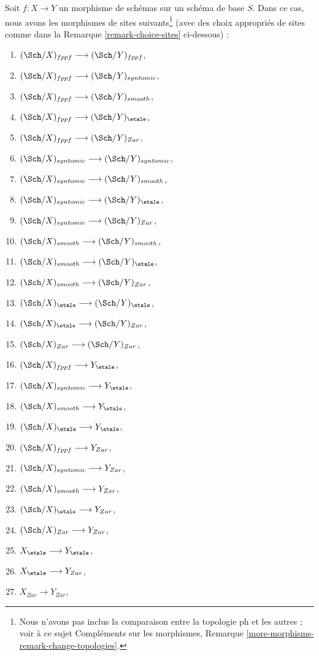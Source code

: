 \noindent
Soit $f : X \to Y$ un morphisme de schémas sur un schéma de base $S$. Dans ce cas, nous avons les morphismes de sites suivants\footnote{Nous n'avons pas inclus la comparaison entre la topologie ph et les autres ; voir à ce sujet Compléments sur les morphismes, Remarque \ref{more-morphisms-remark-change-topologies}.} (avec des choix appropriés de sites comme dans la Remarque \ref{remark-choice-sites} ci-dessous) :
\begin{enumerate}
\item $(\Sch/X)_{fppf} \longrightarrow (\Sch/Y)_{fppf}$,
\item $(\Sch/X)_{fppf} \longrightarrow (\Sch/Y)_{syntomic}$,
\item $(\Sch/X)_{fppf} \longrightarrow (\Sch/Y)_{smooth}$,
\item $(\Sch/X)_{fppf} \longrightarrow (\Sch/Y)_\etale$,
\item $(\Sch/X)_{fppf} \longrightarrow (\Sch/Y)_{Zar}$,
\item $(\Sch/X)_{syntomic} \longrightarrow (\Sch/Y)_{syntomic}$,
\item $(\Sch/X)_{syntomic} \longrightarrow (\Sch/Y)_{smooth}$,
\item $(\Sch/X)_{syntomic} \longrightarrow (\Sch/Y)_\etale$,
\item $(\Sch/X)_{syntomic} \longrightarrow (\Sch/Y)_{Zar}$,
\item $(\Sch/X)_{smooth} \longrightarrow (\Sch/Y)_{smooth}$,
\item $(\Sch/X)_{smooth} \longrightarrow (\Sch/Y)_\etale$,
\item $(\Sch/X)_{smooth} \longrightarrow (\Sch/Y)_{Zar}$,
\item $(\Sch/X)_\etale \longrightarrow (\Sch/Y)_\etale$,
\item $(\Sch/X)_\etale \longrightarrow (\Sch/Y)_{Zar}$,
\item $(\Sch/X)_{Zar} \longrightarrow (\Sch/Y)_{Zar}$,
\item $(\Sch/X)_{fppf} \longrightarrow Y_\etale$,
\item $(\Sch/X)_{syntomic} \longrightarrow Y_\etale$,
\item $(\Sch/X)_{smooth} \longrightarrow Y_\etale$,
\item $(\Sch/X)_\etale \longrightarrow Y_\etale$,
\item $(\Sch/X)_{fppf} \longrightarrow Y_{Zar}$,
\item $(\Sch/X)_{syntomic} \longrightarrow Y_{Zar}$,
\item $(\Sch/X)_{smooth} \longrightarrow Y_{Zar}$,
\item $(\Sch/X)_\etale \longrightarrow Y_{Zar}$,
\item $(\Sch/X)_{Zar} \longrightarrow Y_{Zar}$,
\item $X_\etale \longrightarrow Y_\etale$,
\item $X_\etale \longrightarrow Y_{Zar}$,
\item $X_{Zar} \longrightarrow Y_{Zar}$,
\end{enumerate}
